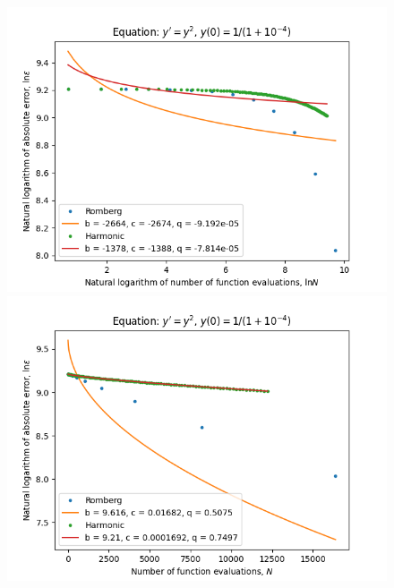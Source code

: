\begin{figure}[H]
\centering
\begin{minipage}{0.45\textwidth}
\centering
\includegraphics[scale=0.45]{emr_plots/singularity_4_hp_log_log_pow_fit_trend.png}
\end{minipage}
\begin{minipage}{0.45\textwidth}
\centering
\includegraphics[scale=0.45]{emr_plots/singularity_4_hp_trend.png}
\end{minipage}
\end{figure}

